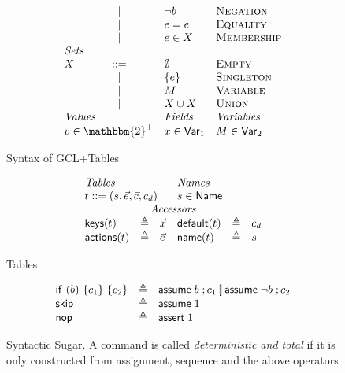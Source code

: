 \begin{figure}[ht]
\[\begin{array}{l c l l}
        & \mid & \neg b & \textsc{Negation} \\ 
        & \mid & e = e & \textsc{Equality} \\
        & \mid & e \in X & \textsc{Membership} \\
      \multicolumn 3 l{\textit{Sets}} \\
      X &::=& \emptyset & \textsc{Empty} \\
        & \mid & \{e\} & \textsc{Singleton}\\
        & \mid & M & \textsc{Variable} \\
        & \mid & X \cup X & \textsc{Union}\\
     \multicolumn{2}{l}{\textit{Values}} & \textit{Fields}  & \textit{Variables}\\
     \multicolumn{2}{l}{v \in \mathbbm{2}^+} & x \in \mathsf{Var}_1 & M \in \mathsf{Var}_2
    \end{array}\]

  \caption{Syntax of GCL+Tables}
  \label{fig:syntaxgcl}
  
\end{figure}


\begin{figure}[ht]
  \[\begin{array}{l >{\triangleq}c l l >{\triangleq}c l}
      \multicolumn 3 l {\textit{Tables}}  & \multicolumn 3 l {\textit{Names}}\\
      \multicolumn 3 l {t::= (s,\vec e, \vec c, c_d)} & \multicolumn 3 l {s \in \Name}\\
      \multicolumn 6 c {\textit{Accessors}}\\
      \keys t && \vec x &  \default t && c_d \\
      \actions t && \vec c & \name t && s
    \end{array}\]

  \caption{Tables}
  \label{fig:tables}
\end{figure}

\begin{figure}[ht]
  \[\begin{array}{lcl}
      \mathsf{if}~(b)~\{c_1\}~\{c_2\} & \triangleq & \mathsf{assume}\; b\;;c_1 \operatorname*{\left[\!\right]} \mathsf{assume}\; \neg b\;; c_2 \\
      \mathsf{skip} & \triangleq& \mathsf{assume}\; 1\; \\
      \mathsf{nop} & \triangleq & \mathsf{assert}\; 1\;
    \end{array}
  \]
  \caption{Syntactic Sugar. A command is called \emph{deterministic
      and total} if it is only constructed from assignment, sequence
    and the above operators}
\end{figure}


